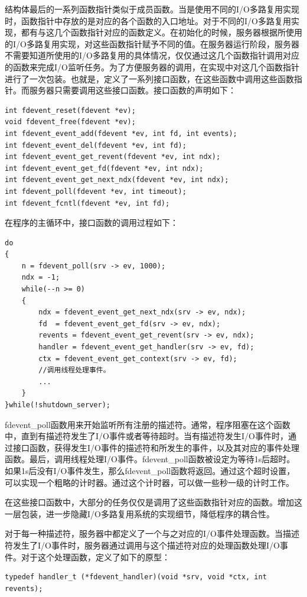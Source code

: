 \documentclass[twoside, xetex]{report}
\begin{document}
	结构体最后的一系列函数指针类似于成员函数。当是使用不同的I/O多路复用实现时，函数指针中存放的是对应的各个函数的入口地址。对于不同的I/O多路复用实现，都有与这几个函数指针对应的函数定义。在初始化的时候，服务器根据所使用的I/O多路复用实现，对这些函数指针赋予不同的值。在服务器运行阶段，服务器不需要知道所使用的I/O多路复用的具体情况，仅仅通过这几个函数指针调用对应的函数来完成I/O监听任务。为了方便服务器的调用，在实现中对这几个函数指针进行了一次包装。也就是，定义了一系列接口函数，在这些函数中调用这些函数指针。而服务器只需要调用这些接口函数。接口函数的声明如下：
\begin{lstlisting}
int fdevent_reset(fdevent *ev);
void fdevent_free(fdevent *ev);
int fdevent_event_add(fdevent *ev, int fd, int events);
int fdevent_event_del(fdevent *ev, int fd);
int fdevent_event_get_revent(fdevent *ev, int ndx);
int fdevent_event_get_fd(fdevent *ev, int ndx);
int fdevent_event_get_next_ndx(fdevent *ev, int ndx);
int fdevent_poll(fdevent *ev, int timeout);
int fdevent_fcntl(fdevent *ev, int fd);
\end{lstlisting}

	在程序的主循环中，接口函数的调用过程如下：
\begin{lstlisting}
do
{
	n = fdevent_poll(srv -> ev, 1000);
	ndx = -1;
	while(--n >= 0)
	{
		ndx = fdevent_event_get_next_ndx(srv -> ev, ndx);
		fd  = fdevent_event_get_fd(srv -> ev, ndx);
		revents = fdevent_event_get_revent(srv -> ev, ndx);
		handler = fdevent_event_get_handler(srv -> ev, fd);
		ctx = fdevent_event_get_context(srv -> ev, fd);			
		//调用线程处理事件。
		...
	}
}while(!shutdown_server);
\end{lstlisting}	

	fdevent\_poll函数用来开始监听所有注册的描述符。通常，程序阻塞在这个函数中，直到有描述符发生了I/O事件或者等待超时。当有描述符发生I/O事件时，通过接口函数，获得发生I/O事件的描述符和所发生的事件，以及其对应的事件处理函数。最后，调用线程处理I/O事件。fdevent\_poll函数被设定为等待1s后超时。如果1s后没有I/O事件发生，那么fdevent\_poll函数将返回。通过这个超时设置，可以实现一个粗略的计时器。通过这个计时器，可以做一些秒一级的计时工作。
	
	在这些接口函数中，大部分的任务仅仅是调用了这些函数指针对应的函数。增加这一层包装，进一步隐藏I/O多路复用系统的实现细节，降低程序的耦合性。

	对于每一种描述符，服务器中都定义了一个与之对应的I/O事件处理函数。当描述符发生了I/O事件时，服务器通过调用与这个描述符对应的处理函数处理I/O事件。对于这个处理函数，定义了如下的原型：
\begin{lstlisting}
typedef handler_t (*fdevent_handler)(void *srv, void *ctx, int revents);
\end{lstlisting}
\end{document}
